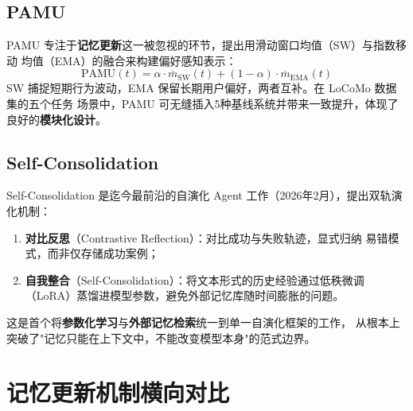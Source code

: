 \documentclass[11pt,a4paper]{article}
\begin{document}
\subsection{PAMU}

PAMU 专注于\textbf{记忆更新}这一被忽视的环节，提出用滑动窗口均值（SW）与指数移动
均值（EMA）的融合来构建偏好感知表示：
$$
\text{PAMU}(t) = \alpha \cdot \overline{m}_{\text{SW}}(t) + (1-\alpha) \cdot \overline{m}_{\text{EMA}}(t)
$$
SW 捕捉短期行为波动，EMA 保留长期用户偏好，两者互补。在 LoCoMo 数据集的五个任务
场景中，PAMU 可无缝插入5种基线系统并带来一致提升，体现了良好的\textbf{模块化设计}。

\subsection{Self-Consolidation}

Self-Consolidation 是迄今最前沿的自演化 Agent 工作（2026年2月），提出双轨演化机制：
\begin{enumerate}
  \item \textbf{对比反思}（Contrastive Reflection）：对比成功与失败轨迹，显式归纳
    易错模式，而非仅存储成功案例；
  \item \textbf{自我整合}（Self-Consolidation）：将文本形式的历史经验通过低秩微调
    （LoRA）蒸馏进模型参数，避免外部记忆库随时间膨胀的问题。
\end{enumerate}
这是首个将\textbf{参数化学习}与\textbf{外部记忆检索}统一到单一自演化框架的工作，
从根本上突破了"记忆只能在上下文中，不能改变模型本身"的范式边界。

\section{记忆更新机制横向对比}
\end{document}
